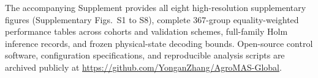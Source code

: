 \documentclass[11pt,a4paper]{article}
\begin{document}
The accompanying Supplement provides all eight high-resolution supplementary figures (Supplementary Figs.~S1 to S8), complete 367-group equality-weighted performance tables across cohorts and validation schemes, full-family Holm inference records, and frozen physical-state decoding bounds. Open-source control software, configuration specifications, and reproducible analysis scripts are archived publicly at \url{https://github.com/YonganZhang/AgroMAS-Global}.

\FloatBarrier\clearpage
\end{document}
